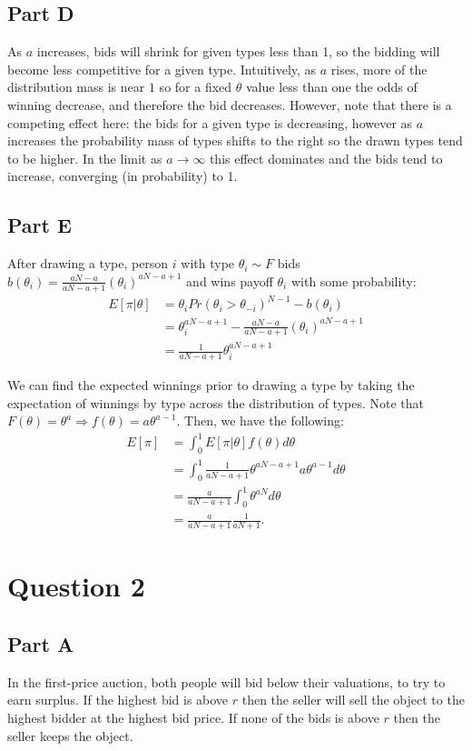 \documentclass[11pt]{article} %
\begin{document}
\subsection{Part D}
As $a$ increases, bids will shrink for given types less than 1, so the bidding will become less competitive for a given type. Intuitively, as $a$ rises, more of the distribution mass is near $1$ so for a fixed $\theta$ value less than one the odds of winning decrease, and therefore the bid decreases. However, note that there is a competing effect here: the bids for a given type is decreasing, however as $a$ increases the probability mass of types shifts to the right so the drawn types tend to be higher. In the limit as $a\rightarrow \infty$ this effect dominates and the bids tend to increase, converging (in probability) to 1. 
\subsection{Part E}
After drawing a type, person $i$ with type $\theta_i \sim F$ bids $b(\theta_i) =  \frac{aN-a}{aN-a+1}(\theta_i)^{aN-a+1}$ and wins payoff $\theta_i$ with some probability:
\begin{align*}
E[\pi|\theta] &= \theta_i Pr(\theta_i>\theta_{-i})^{N-1} - b(\theta_i)\\
&= \theta_i^{aN-a+1} - \frac{aN-a}{aN-a+1}(\theta_i)^{aN-a+1}\\
&= \frac{1}{aN - a + 1}\theta_i^{aN-a+1}
\end{align*}

We can find the expected winnings prior to drawing a type by taking the expectation of winnings by type across the distribution of types. Note that $F(\theta) = \theta^a \Rightarrow f(\theta) = a\theta^{a-1}$. Then, we have the following:
\begin{align*}
E[\pi] &= \int_{0}^1 E[\pi|\theta] f(\theta)d\theta \\
&=  \int_{0}^1\frac{1}{aN - a + 1}\theta^{aN-a+1} a\theta^{a-1}d\theta\\
&= \frac{a}{aN - a + 1}\int_{0}^1\theta^{aN} d\theta\\
&=  \frac{a}{aN - a + 1} \frac{1}{aN+1}.
\end{align*}
\section{Question 2}
\subsection{Part A}
In the first-price auction, both people will bid below their valuations, to try to earn surplus. If the highest bid is above $r$ then the seller will sell the object to the highest bidder at the highest bid price. If none of the bids is above $r$ then the seller keeps the object.
\end{document}
